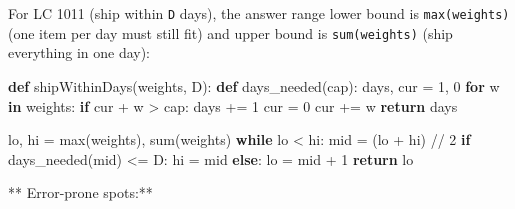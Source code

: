 \documentclass[11pt]{article}
\newenvironment{Shaded}{\begin{snugshade}}{\end{snugshade}}
\newcommand{\BuiltInTok}[1]{\textcolor[rgb]{0.50,0.55,0.55}{#1}}
\newcommand{\ControlFlowTok}[1]{\textcolor[rgb]{0.99,0.74,0.29}{\textbf{#1}}}
\newcommand{\DecValTok}[1]{\textcolor[rgb]{0.96,0.45,0.00}{#1}}
\newcommand{\KeywordTok}[1]{\textcolor[rgb]{0.81,0.81,0.76}{\textbf{#1}}}
\newcommand{\NormalTok}[1]{\textcolor[rgb]{0.81,0.81,0.76}{#1}}
\newcommand{\OperatorTok}[1]{\textcolor[rgb]{0.81,0.81,0.76}{#1}}
\begin{document}
For LC 1011 (ship within \texttt{D} days), the answer range lower bound is \texttt{max(weights)} (one item per day must still fit) and upper bound is \texttt{sum(weights)} (ship everything in one day):


\begin{Shaded}
\begin{Highlighting}[]
\KeywordTok{def}\NormalTok{ shipWithinDays(weights, D):}
    \KeywordTok{def}\NormalTok{ days\_needed(cap):}
\NormalTok{        days, cur }\OperatorTok{=} \DecValTok{1}\NormalTok{, }\DecValTok{0}
        \ControlFlowTok{for}\NormalTok{ w }\KeywordTok{in}\NormalTok{ weights:}
            \ControlFlowTok{if}\NormalTok{ cur }\OperatorTok{+}\NormalTok{ w }\OperatorTok{\textgreater{}}\NormalTok{ cap:}
\NormalTok{                days }\OperatorTok{+=} \DecValTok{1}
\NormalTok{                cur }\OperatorTok{=} \DecValTok{0}
\NormalTok{            cur }\OperatorTok{+=}\NormalTok{ w}
        \ControlFlowTok{return}\NormalTok{ days}

\NormalTok{    lo, hi }\OperatorTok{=} \BuiltInTok{max}\NormalTok{(weights), }\BuiltInTok{sum}\NormalTok{(weights)}
    \ControlFlowTok{while}\NormalTok{ lo }\OperatorTok{\textless{}}\NormalTok{ hi:}
\NormalTok{        mid }\OperatorTok{=}\NormalTok{ (lo }\OperatorTok{+}\NormalTok{ hi) }\OperatorTok{//} \DecValTok{2}
        \ControlFlowTok{if}\NormalTok{ days\_needed(mid) }\OperatorTok{\textless{}=}\NormalTok{ D:}
\NormalTok{            hi }\OperatorTok{=}\NormalTok{ mid}
        \ControlFlowTok{else}\NormalTok{:}
\NormalTok{            lo }\OperatorTok{=}\NormalTok{ mid }\OperatorTok{+} \DecValTok{1}
    \ControlFlowTok{return}\NormalTok{ lo}
\end{Highlighting}
\end{Shaded}

** Error-prone spots:**
\end{document}

